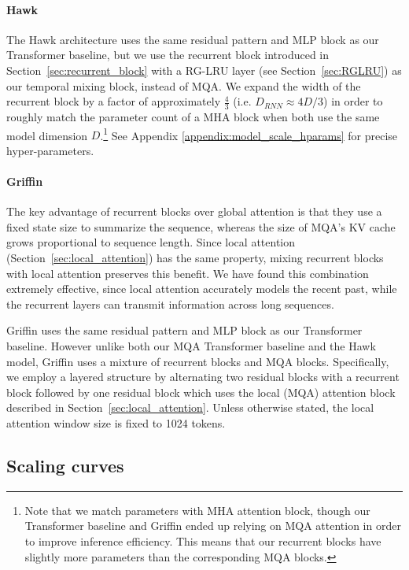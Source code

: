 \paragraph{Hawk}
\label{sec:hawk}
The Hawk architecture uses the same residual pattern and MLP block as our Transformer baseline, but we use the recurrent block introduced in Section~\ref{sec:recurrent_block} with a RG-LRU layer (see Section~\ref{sec:RGLRU}) as our temporal mixing block, instead of MQA. We expand the width of the recurrent block by a factor of approximately $\frac{4}{3}$ (i.e. $D_{RNN} \approx 4D/3$) in order to roughly match the parameter count of a MHA block when both use the same model dimension $D$.\footnote{Note that we match parameters with MHA attention block, though our Transformer baseline and Griffin ended up relying on MQA attention in order to improve inference efficiency. This means that our recurrent blocks have slightly more parameters than the corresponding MQA blocks.} See Appendix \ref{appendix:model_scale_hparams} for precise hyper-parameters.

\paragraph{Griffin}
\label{sec:griffin}

The key advantage of recurrent blocks over global attention is that they use a fixed state size to summarize the sequence, whereas the size of MQA's KV cache grows proportional to sequence length. Since local attention (Section~\ref{sec:local_attention}) has the same property, mixing recurrent blocks with local attention preserves this benefit. We have found this combination extremely effective, since local attention accurately models the recent past, while the recurrent layers can transmit information across long sequences. 

Griffin uses the same residual pattern and MLP block as our Transformer baseline. However unlike both our MQA Transformer baseline and the Hawk model, Griffin uses a mixture of recurrent blocks and MQA blocks. Specifically, we employ a layered structure by alternating two residual blocks with a recurrent block followed by one residual block which uses the local (MQA) attention block described in Section~\ref{sec:local_attention}. 
Unless otherwise stated, the local attention window size is fixed to 1024 tokens.

\subsection{Scaling curves}

